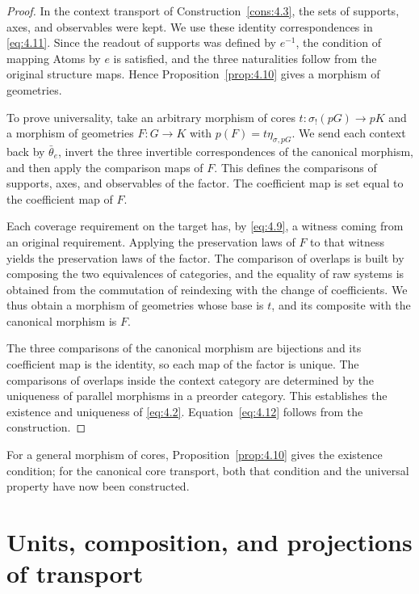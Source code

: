 \begin{proof}

In the context transport of Construction~\ref{cons:4.3}, the sets of supports, axes, and
observables were kept. We use these identity correspondences in \eqref{eq:4.11}. Since the
readout of supports was defined by $e^{-1}$, the condition of mapping Atoms by $e$ is
satisfied, and the three naturalities follow from the original structure maps.
Hence Proposition~\ref{prop:4.10} gives a morphism of geometries.

To prove universality, take an arbitrary morphism of cores
$t:\sigma_!(pG)\to pK$ and a morphism of geometries $F:G\to K$ with
$p(F)=t\eta_{\sigma,pG}$.
We send each context back by $\bar\theta_e$, invert the three invertible correspondences
of the canonical morphism, and then apply the comparison maps of $F$.
This defines the comparisons of supports, axes, and observables of the factor.
The coefficient map is set equal to the coefficient map of $F$.

Each coverage requirement on the target has, by \eqref{eq:4.9}, a witness coming from an
original requirement.
Applying the preservation laws of $F$ to that witness yields the preservation laws of the
factor.
The comparison of overlaps is built by composing the two equivalences of categories, and
the equality of raw systems is obtained from the commutation of reindexing with the change
of coefficients.
We thus obtain a morphism of geometries whose base is $t$, and its composite with the
canonical morphism is $F$.

The three comparisons of the canonical morphism are bijections and its coefficient map is
the identity, so each map of the factor is unique.
The comparisons of overlaps inside the context category are determined by the uniqueness
of parallel morphisms in a preorder category.
This establishes the existence and uniqueness of \eqref{eq:4.2}.
Equation~\eqref{eq:4.12} follows from the construction.

\end{proof}

For a general morphism of cores, Proposition~\ref{prop:4.10} gives the existence
condition; for the canonical core transport, both that condition and the universal
property have now been constructed.

\section{Units, composition, and projections of transport}\label{sec:4.4}

